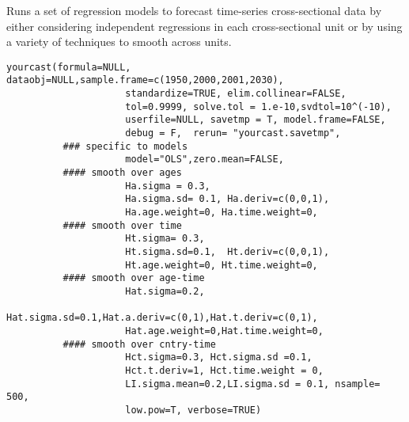 %
\begin{Description}\relax
Runs a set of regression models to forecast time-series cross-sectional data by either
considering independent regressions in each cross-sectional unit or by
using a variety of techniques to smooth across units.
\end{Description}
%
\begin{Usage}
\begin{verbatim}
yourcast(formula=NULL, dataobj=NULL,sample.frame=c(1950,2000,2001,2030), 
                     standardize=TRUE, elim.collinear=FALSE,
                     tol=0.9999, solve.tol = 1.e-10,svdtol=10^(-10),
                     userfile=NULL, savetmp = T, model.frame=FALSE,
                     debug = F,  rerun= "yourcast.savetmp", 
          ### specific to models
                     model="OLS",zero.mean=FALSE,
          #### smooth over ages           
                     Ha.sigma = 0.3,
                     Ha.sigma.sd= 0.1, Ha.deriv=c(0,0,1),
                     Ha.age.weight=0, Ha.time.weight=0,
          #### smooth over time
                     Ht.sigma= 0.3,
                     Ht.sigma.sd=0.1,  Ht.deriv=c(0,0,1),
                     Ht.age.weight=0, Ht.time.weight=0,
          #### smooth over age-time
                     Hat.sigma=0.2,
                     Hat.sigma.sd=0.1,Hat.a.deriv=c(0,1),Hat.t.deriv=c(0,1), 
                     Hat.age.weight=0,Hat.time.weight=0,
          #### smooth over cntry-time
                     Hct.sigma=0.3, Hct.sigma.sd =0.1,
                     Hct.t.deriv=1, Hct.time.weight = 0,
                     LI.sigma.mean=0.2,LI.sigma.sd = 0.1, nsample= 500,
                     low.pow=T, verbose=TRUE)
\end{verbatim}
\end{Usage}
%
